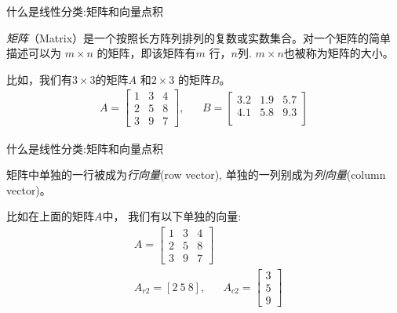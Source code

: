 \documentclass[handout]{beamer}
\begin{document}
\begin{frame}{什么是线性分类:矩阵和向量点积}
\begin{definition}
	\textit{矩阵}（Matrix）是一个按照长方阵列排列的复数或实数集合。对一个矩阵的简单描述可以为 $m \times n$ 的矩阵，即该矩阵有$m$ 行，$n$列. $m \times n$也被称为矩阵的大小。
\end{definition}

\begin{example}
比如，我们有$3 \times 3 $的矩阵$A$ 和$2 \times 3$ 的矩阵$B$。
\begin{align*}
	 A = \begin{bmatrix}
	1 & 3 & 4 \\
	2 & 5 & 8 \\
	3 & 9 & 7
\end{bmatrix}, & & B = \begin{bmatrix}
	3.2 & 1.9 & 5.7 \\
	4.1 & 5.8 & 9.3 \\
\end{bmatrix}
\end{align*}	
\end{example}
\end{frame}

\begin{frame}{什么是线性分类:矩阵和向量点积}
\begin{definition}
	矩阵中单独的一行被成为\textit{行向量}(row vector), 单独的一列别成为\textit{列向量}(column vector)。
\end{definition}
\begin{example}
比如在上面的矩阵$A$中，	我们有以下单独的向量:
\begin{align*}
 & A = \begin{bmatrix}
	1 & 3 & 4 \\
	2 & 5 & 8 \\
	3 & 9 & 7
\end{bmatrix} \\
	& A_{r2} = [2 \ 5 \ 8],   & A_{c2} = \begin{bmatrix}
		3 \\
		5 \\
		9 
	\end{bmatrix}
\end{align*}
\end{example}
\end{frame}
\end{document}
